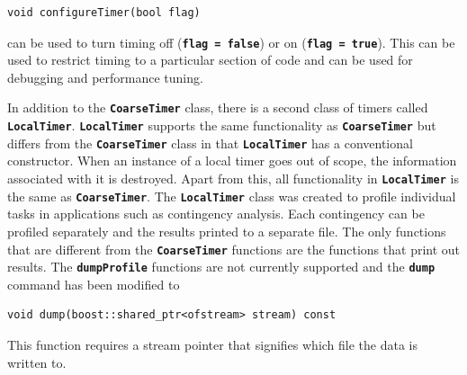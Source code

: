 {
\color{red}
\begin{Verbatim}[fontseries=b]
void configureTimer(bool flag)
\end{Verbatim}
}

can be used to turn timing off (\texttt{\textbf{flag = false}}) or on (\texttt{\textbf{flag = true}}). This can be used to restrict timing to a particular section of code and can be used for debugging and performance tuning.

In addition to the \texttt{\textbf{CoarseTimer}} class, there is a second class of timers called \texttt{\textbf{LocalTimer}}. \texttt{\textbf{LocalTimer}} supports the same functionality as \texttt{\textbf{CoarseTimer}} but differs from the \texttt{\textbf{CoarseTimer}} class in that \texttt{\textbf{LocalTimer}} has a conventional constructor. When an instance of a local timer goes out of scope, the information associated with it is destroyed. Apart from this, all functionality in \texttt{\textbf{LocalTimer}} is the same as \texttt{\textbf{CoarseTimer}}. The \texttt{\textbf{LocalTimer}} class was created to profile individual tasks in applications such as contingency analysis. Each contingency can be profiled separately and the results printed to a separate file. The only functions that are different from the \texttt{\textbf{CoarseTimer}} functions are the functions that print out results. The \texttt{\textbf{dumpProfile}} functions are not currently supported and the \texttt{\textbf{dump}} command has been modified to

{
\color{red}
\begin{Verbatim}[fontseries=b]
void dump(boost::shared_ptr<ofstream> stream) const
\end{Verbatim}
}

This function requires a stream pointer that signifies which file the data is written to.
\newline
\hyperlink{topDoc}{\color{blue}{Top}}
